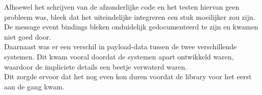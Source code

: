 Alhoewel het schrijven van de afzonderlijke code en het testen hiervan geen probleem was, bleek dat het uiteindelijke integreren een stuk moeilijker zou zijn. De message event bindings bleken onduidelijk gedocumenteerd te zijn en kwamen niet goed door. \\

Daarnaast was er een verschil in payload-data tussen de twee verschillende systemen. Dit kwam vooral doordat de systemen apart ontwikkeld waren, waardoor de impliciete details een beetje verwaterd waren. \\

Dit zorgde ervoor dat het nog even kon duren voordat de library voor het eerst aan de gang kwam.



	